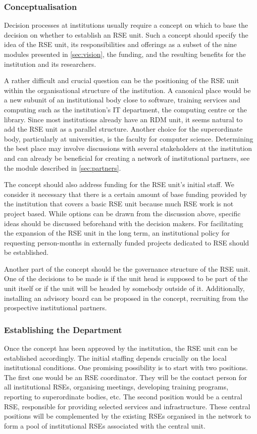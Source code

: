 \documentclass[a4paper]{article}
\begin{document}
\subsubsection{Conceptualisation}
Decision processes at institutions usually require a concept on which to base the decision on whether to establish an RSE unit.
Such a concept should specify the idea of the RSE unit, its responsibilities and offerings as a subset of the nine modules presented in \autoref{sec:vision}, the funding, and the resulting benefits for the institution and its researchers.

A rather difficult and crucial question can be the positioning of the RSE unit within the organisational structure of the institution.
A canonical place would be a new subunit of an institutional body close to software,
training services and computing such as the institution's IT department, the computing centre or the library.
Since most institutions already have an RDM unit, it seems natural to add the RSE unit as a parallel structure.
Another choice for the superordinate body, particularly at universities, is the faculty for computer science.
Determining the best place may involve discussions with several stakeholders at the institution and can already be beneficial for creating a
network of institutional partners, see the module described in \autoref{sec:partners}.

The concept should also address funding for the RSE unit's initial staff.
We consider it necessary that there is a certain amount of base funding provided by the institution that covers a basic RSE unit because much RSE work is not project based.
While options can be drawn from the discussion above, specific ideas should be discussed beforehand with the decision makers.
For facilitating the expansion of the RSE unit in the long term, an institutional policy for requesting person-months in externally funded projects dedicated to RSE should be established.

Another part of the concept should be the governance structure of the RSE unit.
One of the decisions to be made is if the unit head is supposed to be part of the unit itself or if the unit will be headed by somebody outside of it.
Additionally, installing an advisory board can be proposed in the concept, recruiting from the prospective institutional partners.

\subsubsection{Establishing the Department}
Once the concept has been approved by the institution, the RSE unit can be established accordingly.
The initial staffing depends crucially on the local institutional conditions.
One promising possibility is to start with two positions.
The first one would be an RSE coordinator.
They will be the contact person for all institutional RSEs, organising meetings, developing training programs, reporting to superordinate bodies, etc.
The second position would be a central RSE, responsible for providing selected services and infrastructure.
These central positions will be complemented by the existing RSEs organised in the network to form a pool of institutional RSEs associated with the central unit.
\end{document}
